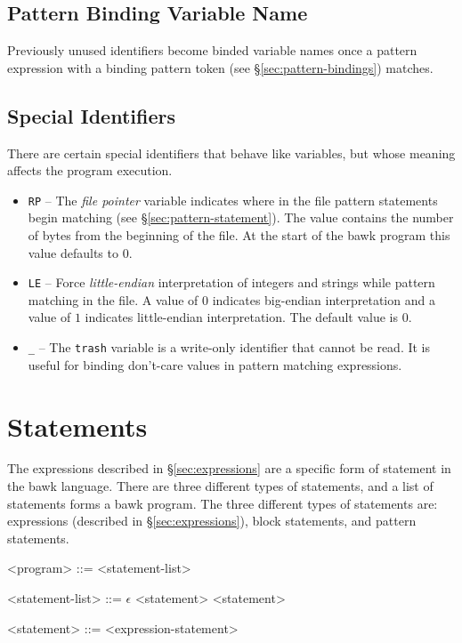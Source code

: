 \documentclass[letterpaper]{article}
\begin{document}
\subsection{Pattern Binding Variable Name}
\label{sec:bind-variables}
Previously unused identifiers become binded variable names once a pattern expression with a binding pattern token (see \S\ref{sec:pattern-bindings}) matches.

\subsection{Special Identifiers}
There are certain special identifiers that behave like variables, but whose meaning affects the program execution.
\begin{itemize}
\item \texttt{RP} -- The \textsl{file pointer} variable  indicates where in the file pattern statements begin matching (see \S\ref{sec:pattern-statement}).  The value contains the number of bytes from the beginning of the file.  At the start of the bawk program this value defaults to $0$.
\item \texttt{LE} -- Force \textsl{little-endian} interpretation of integers and strings while pattern matching in the file.  A value of $0$ indicates big-endian interpretation and a value of $1$ indicates little-endian interpretation.  The default value is $0$.
\item \texttt{_} -- The \texttt{trash} variable is a write-only identifier that cannot be read.  It is useful for binding don't-care values in pattern matching expressions.
\end{itemize}

\section{Statements}
\label{sec:statements}
The expressions described in \S\ref{sec:expressions} are a specific form of statement in the bawk language.  There are three different types of statements, and a list of statements forms a bawk program.  The three different types of statements are: expressions (described in \S\ref{sec:expressions}), block statements, and pattern statements.
\begin{grammar}
<program> ::= <statement-list>

<statement-list> ::= $\epsilon$
\alt <statement>
 <statement>

<statement> ::= <expression-statement>
\end{grammar}
\end{document}
